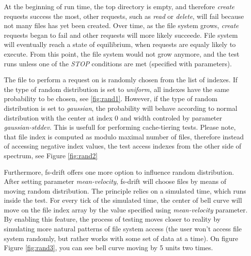 \documentclass[
  color, %
  table, %
  lof,   %
  lot,   %
]{fithesis3}
\begin{document}
At the beginning of run time, the top directory is empty, and therefore \textit{create} requests success the most, other requests, such as \textit{read} or \textit{delete}, will fail because not many files has yet been created. Over time, as the file system grows, \textit{create} requests began to fail and other requests will more likely succeede. File system will eventually reach a state of equilibrium, when requests are equaly likely to execute. From this point, the file system would not grow anymore, and the test runs unless one of the \textit{STOP} conditions are met (specified with parameters).

The file to perform a request on is randomly chosen from the list of indexes. If the type of random distribution is set to \textit{uniform}, all indexes have the same probability to be chosen, see \ref{fig:rand1}. However, if the type of random distribution is set to \textit{gaussian}, the probability will behave according to normal distribution with the center at index 0 and width controled by parameter \textit{gaussian-stddev}. This is usefull for performing cache-tiering tests. Please note, that file index is computed as modulo maximal number of files, therefore instead of accessing negative index values, the test access indexes from the other side of spectrum, see Figure \ref{fig:rand2}

Furthermore, fs-drift offers one more option to influence random distribution. After setting parameter \textit{mean-velocity}, fs-drift will choose files by means of moving random distribution. The principle relies on a simulated time, which runs inside the test. For every tick of the simulated time, the center of bell curve will move on the file index array by the value specified using \textit{mean-velocity} parameter. By enabling this feature, the process of testing moves closer to reality by simulating more natural patterns of file system access (the user won't access file system randomly, but rather works with some set of data at a time). On figure Figure \ref{fig:rand3}, you can see bell curve moving by 5 units two times.
\end{document}
